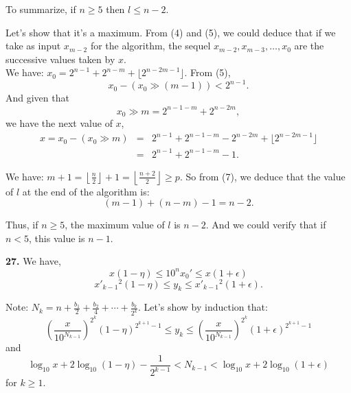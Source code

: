 \documentclass[a4paper,12pt]{article}
\newcommand{\newpar}[1]{\bigskip \noindent \textbf{#1.}}
\begin{document}
To summarize, if $n \ge 5$ then $l \le n-2$.  

Let's show that it's a maximum.  From (4) and (5), we could deduce that if we 
take as input $x_{m-2}$ for the algorithm, the sequel $x_{m-2}, x_{m-3}, 
\ldots, x_0$ are the successive values taken by $x$.\\
We have: $x_0 = 2^{n-1} + 2^{n-m} + \lfloor 2^{n-2m-1} \rfloor$.  From (5),
\[x_0 - (x_0 \gg (m-1)) < 2^{n-1}.\]And given that
\[x_0 \gg m = 2^{n-1-m} + 2^{n-2m},\]we have the next value of $x$, 
\begin{eqnarray*}
x = x_0 - (x_0 \gg m) & = &
2^{n-1} + 2^{n-1-m} - 2^{n-2m} + \lfloor 2^{n-2m-1}\rfloor\\ & = &
2^{n-1} + 2^{n-1-m} - 1.
\end{eqnarray*}
 
We have: $m+1 = \left\lfloor\frac{n}{2}\right\rfloor + 1 =
\left\lfloor\frac{n+2}{2}\right\rfloor \ge p$.  So from (7), we deduce that
the value of $l$ at the end of the algorithm is:
\[ (m-1) + (n-m) - 1 = n-2.\]

Thus, if $n \ge 5$, the maximum value of $l$ is $n-2$.  And we could verify
that if $n < 5$, this value is $n-1$.

\newpar{27} We have,
\[x(1 - \eta) \le 10^n x_0' \le x(1 + \epsilon)\]
\[{x'}_{k-1}{}^2(1 - \eta) \le y_k \le {x'}_{k-1}{}^2(1 + \epsilon).\]

Note: $N_k = n + \frac{b_1}{2} + \frac{b_2}{4} + \cdots + \frac{b_k}{2^k}$.
Let's show by induction that:
\[\left(\frac{x}{10^{N_{k-1}}}\right)^{2^k}(1 - \eta)^{2^{k+1}-1} \le
y_k \le \left(\frac{x}{10^{N_{k-1}}}\right)^{2^k}(1 + \epsilon)^{2^{k+1} - 1}\] and
\[\log_{10}x  + 2 \log_{10}(1 - \eta) - \frac{1}{2^{k-1}} < N_{k-1} <
\log_{10}x + 2 \log_{10}(1 + \epsilon)\] for $k \ge 1$.
\end{document}
